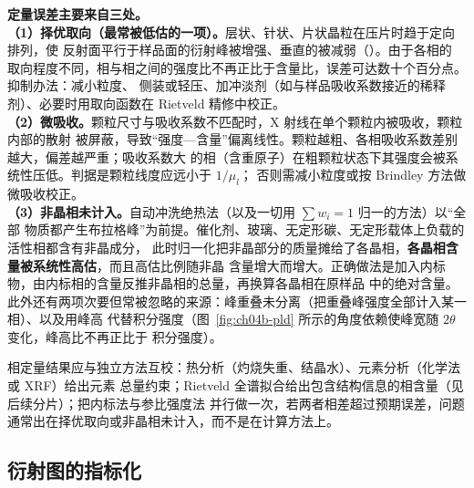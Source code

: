 \begin{pitfall}
\textbf{定量误差主要来自三处。}\\
\textbf{（1）择优取向（最常被低估的一项）。}层状、针状、片状晶粒在压片时趋于定向排列，使
反射面平行于样品面的衍射峰被增强、垂直的被减弱（）。由于各相的
取向程度不同，相与相之间的强度比不再正比于含量比，误差可达数十个百分点。抑制办法：减小粒度、
侧装或轻压、加冲淡剂（如与样品吸收系数接近的稀释剂）、必要时用取向函数在 Rietveld 精修中校正。\\
\textbf{（2）微吸收。}颗粒尺寸与吸收系数不匹配时，X 射线在单个颗粒内被吸收，颗粒内部的散射
被屏蔽，导致“强度—含量”偏离线性。颗粒越粗、各相吸收系数差别越大，偏差越严重；吸收系数大
的相（含重原子）在粗颗粒状态下其强度会被系统性压低。判据是颗粒线度应远小于 $1/\mu_{l}$；
否则需减小粒度或按 Brindley 方法做微吸收校正。\\
\textbf{（3）非晶相未计入。}自动冲洗绝热法（以及一切用 $\sum w_{i}=1$ 归一的方法）以“全部
物质都产生布拉格峰”为前提。催化剂、玻璃、无定形碳、无定形载体上负载的活性相都含有非晶成分，
此时归一化把非晶部分的质量摊给了各晶相，\textbf{各晶相含量被系统性高估}，而且高估比例随非晶
含量增大而增大。正确做法是加入内标物，由内标相的含量反推非晶相的总量，再换算各晶相在原样品
中的绝对含量。\\
此外还有两项次要但常被忽略的来源：峰重叠未分离（把重叠峰强度全部计入某一相）、以及用峰高
代替积分强度（图~\ref{fig:ch04b-pld} 所示的角度依赖使峰宽随 $2\theta$ 变化，峰高比不再正比于
积分强度）。
\end{pitfall}

\begin{crosscheck}
相定量结果应与独立方法互校：热分析（灼烧失重、结晶水）、元素分析（化学法或 XRF）给出元素
总量约束；Rietveld 全谱拟合给出包含结构信息的相含量（见后续分片）；把内标法与参比强度法
并行做一次，若两者相差超过预期误差，问题通常出在择优取向或非晶相未计入，而不是在计算方法上。
\end{crosscheck}

\subsection{衍射图的指标化}

